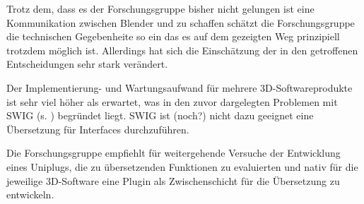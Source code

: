 
Trotz dem, dass es der Forschungsgruppe bisher nicht gelungen ist eine Kommunikation zwischen Blender und \CS zu schaffen schätzt die Forschungsgruppe die technischen Gegebenheite so ein das es auf dem gezeigten Weg prinzipiell trotzdem möglich ist. Allerdings hat sich die Einschätzung der in den  getroffenen Entscheidungen sehr stark verändert.

Der Implementierung- und Wartungsaufwand für mehrere 3D-Softwareprodukte ist sehr viel höher als erwartet, was in den zuvor dargelegten Problemen mit SWIG (s. ) begründet liegt. SWIG ist (noch?) nicht dazu geeignet eine Übersetzung für  Interfaces durchzuführen.

Die Forschungsgruppe empfiehlt für weitergehende Versuche der Entwicklung eines Uniplugs, die zu übersetzenden Funktionen zu evaluierten und nativ für die jeweilige 3D-Software eine Plugin als Zwischenschicht für die Übersetzung zu entwickeln.


